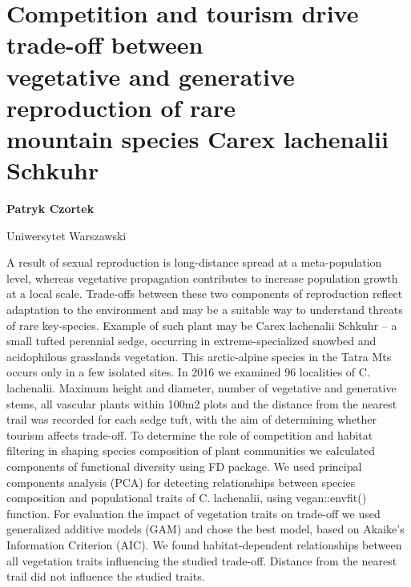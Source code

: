\documentclass[\main/boa.tex]{subfiles}
\begin{document}
\section[Competition and tourism drive trade-off between vegetative and generative \\ reproduction of rare mountain species Carex lachenalii Schkuhr]{Competition and tourism drive trade-off between \\ vegetative and generative reproduction of rare \\ mountain species Carex lachenalii Schkuhr}

\begin{minipage}{0.915\textwidth}
	\centering
  {\bf {} Patryk Czortek}
\end{minipage}


\begin{affiliations}
\begin{minipage}{0.915\textwidth}
\centering
Uniwersytet Warszawski  \\[-2pt]
\end{minipage}
\end{affiliations}

\vskip 0.3cm

 A result of sexual reproduction is long-distance spread at a meta-population level, whereas vegetative propagation contributes to increase population growth at a local scale. Trade-offs between these two components of reproduction reflect adaptation to the environment and may be a suitable way to understand threats of rare key-species. Example of such plant may be Carex lachenalii Schkuhr – a small tufted perennial sedge, occurring in extreme-specialized snowbed and acidophilous grasslands vegetation. This arctic-alpine species in the Tatra Mts occurs only in a few isolated sites. In 2016 we examined 96 localities of C. lachenalii. Maximum height and diameter, number of vegetative and generative stems, all vascular plants within 100m2 plots and the distance from the nearest trail was recorded for each sedge tuft, with the aim of determining whether tourism affects trade-off. To determine the role of competition and habitat filtering in shaping species composition of plant communities we calculated components of functional diversity using FD package. We used principal components analysis (PCA) for detecting relationships between species composition and populational traits of C. lachenalii, using vegan::envfit() function. For evaluation the impact of vegetation traits on trade-off we used generalized additive models (GAM) and chose the best model, based on Akaike’s Information Criterion (AIC). We found habitat-dependent relationships between all vegetation traits influencing the studied trade-off. Distance from the nearest trail did not influence the studied traits. 
\end{document}
